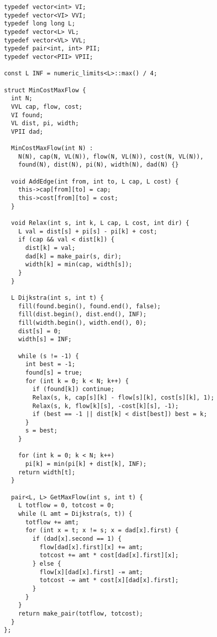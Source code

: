 \documentclass[11pt, oneside]{article}
\begin{document}
\begin{lstlisting}
typedef vector<int> VI;
typedef vector<VI> VVI;
typedef long long L;
typedef vector<L> VL;
typedef vector<VL> VVL;
typedef pair<int, int> PII;
typedef vector<PII> VPII;

const L INF = numeric_limits<L>::max() / 4;

struct MinCostMaxFlow {
  int N;
  VVL cap, flow, cost;
  VI found;
  VL dist, pi, width;
  VPII dad;

  MinCostMaxFlow(int N) : 
    N(N), cap(N, VL(N)), flow(N, VL(N)), cost(N, VL(N)), 
    found(N), dist(N), pi(N), width(N), dad(N) {}
  
  void AddEdge(int from, int to, L cap, L cost) {
    this->cap[from][to] = cap;
    this->cost[from][to] = cost;
  }
  
  void Relax(int s, int k, L cap, L cost, int dir) {
    L val = dist[s] + pi[s] - pi[k] + cost;
    if (cap && val < dist[k]) {
      dist[k] = val;
      dad[k] = make_pair(s, dir);
      width[k] = min(cap, width[s]);
    }
  }

  L Dijkstra(int s, int t) {
    fill(found.begin(), found.end(), false);
    fill(dist.begin(), dist.end(), INF);
    fill(width.begin(), width.end(), 0);
    dist[s] = 0;
    width[s] = INF;
    
    while (s != -1) {
      int best = -1;
      found[s] = true;
      for (int k = 0; k < N; k++) {
        if (found[k]) continue;
        Relax(s, k, cap[s][k] - flow[s][k], cost[s][k], 1);
        Relax(s, k, flow[k][s], -cost[k][s], -1);
        if (best == -1 || dist[k] < dist[best]) best = k;
      }
      s = best;
    }

    for (int k = 0; k < N; k++)
      pi[k] = min(pi[k] + dist[k], INF);
    return width[t];
  }

  pair<L, L> GetMaxFlow(int s, int t) {
    L totflow = 0, totcost = 0;
    while (L amt = Dijkstra(s, t)) {
      totflow += amt;
      for (int x = t; x != s; x = dad[x].first) {
        if (dad[x].second == 1) {
          flow[dad[x].first][x] += amt;
          totcost += amt * cost[dad[x].first][x];
        } else {
          flow[x][dad[x].first] -= amt;
          totcost -= amt * cost[x][dad[x].first];
        }
      }
    }
    return make_pair(totflow, totcost);
  }
};
\end{lstlisting}
\end{document}
